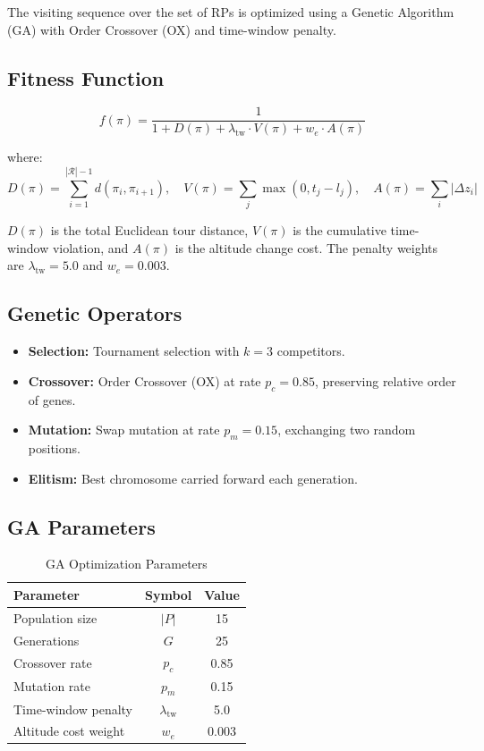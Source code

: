 \documentclass[12pt, a4paper, oneside]{report}
\begin{document}
The visiting sequence over the set of RPs is optimized using a Genetic Algorithm (GA) with Order Crossover (OX) and time-window penalty.

\subsection{Fitness Function}

\begin{equation}
f(\pi) = \frac{1}{1 + D(\pi) + \lambda_{\text{tw}} \cdot V(\pi) + w_e \cdot A(\pi)}
\label{eq:fitness}
\end{equation}

where:
\begin{equation}
D(\pi) = \sum_{i=1}^{|\mathcal{R}|-1} d(\pi_i, \pi_{i+1}), \quad V(\pi) = \sum_j \max(0, t_j - l_j), \quad A(\pi) = \sum_i |\Delta z_i|
\label{eq:fitness_components}
\end{equation}

$D(\pi)$ is the total Euclidean tour distance, $V(\pi)$ is the cumulative time-window violation, and $A(\pi)$ is the altitude change cost. The penalty weights are $\lambda_{\text{tw}} = 5.0$ and $w_e = 0.003$.

\subsection{Genetic Operators}

\begin{itemize}
    \item \textbf{Selection:} Tournament selection with $k = 3$ competitors.
    \item \textbf{Crossover:} Order Crossover (OX) at rate $p_c = 0.85$, preserving relative order of genes.
    \item \textbf{Mutation:} Swap mutation at rate $p_m = 0.15$, exchanging two random positions.
    \item \textbf{Elitism:} Best chromosome carried forward each generation.
\end{itemize}

\subsection{GA Parameters}

\begin{table}[htbp]
\centering
\caption{GA Optimization Parameters}
\label{tab:ga_params}
\begin{tabular}{lcc}
\toprule
\textbf{Parameter} & \textbf{Symbol} & \textbf{Value} \\
\midrule
Population size & $|P|$ & 15 \\
Generations & $G$ & 25 \\
Crossover rate & $p_c$ & 0.85 \\
Mutation rate & $p_m$ & 0.15 \\
Time-window penalty & $\lambda_{\text{tw}}$ & 5.0 \\
Altitude cost weight & $w_e$ & 0.003 \\
\bottomrule
\end{tabular}
\end{table}
\end{document}
